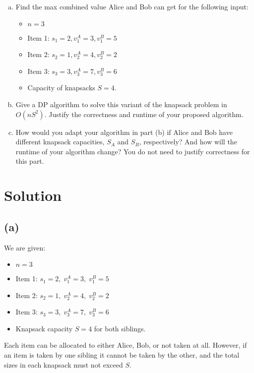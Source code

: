 \documentclass[11pt]{article}
\begin{document}
\begin{tcolorbox}[title={Problem 1 (Knapsack, Take II, 50 pts)}]
        \begin{enumerate}[(a)]
            \item Find the max combined value Alice and Bob can get for the following input:
            \begin{itemize}
                \item \( n = 3 \)
                \item Item 1: \( s_1 = 2, v_1^A = 3, v_1^B = 5 \)
                \item Item 2: \( s_2 = 1, v_2^A = 4, v_2^B = 2 \)
                \item Item 3: \( s_3 = 3, v_3^A = 7, v_3^B = 6 \)
                \item Capacity of knapsacks \(S = 4\).
            \end{itemize} 
            \item Give a DP algorithm to solve this variant of the knapsack problem in $O(nS^2)$. Justify the correctness and runtime of your proposed algorithm. 
            \item How would you adapt your algorithm in part (b) if Alice and Bob have different knapsack capacities, \(S_A\) and \(S_B\), respectively? And how will the runtime of your algorithm change? You do not need to justify correctness for this part.
        \end{enumerate}
    \end{tcolorbox}

    \section*{Solution}

    \subsection*{(a)}
    We are given:
    \begin{itemize}
        \item \( n = 3 \)
        \item Item 1: \( s_1 = 2,\; v_1^A = 3,\; v_1^B = 5 \)
        \item Item 2: \( s_2 = 1,\; v_2^A = 4,\; v_2^B = 2 \)
        \item Item 3: \( s_3 = 3,\; v_3^A = 7,\; v_3^B = 6 \)
        \item Knapsack capacity \( S = 4 \) for both siblings.
    \end{itemize}
    
    Each item can be allocated to either Alice, Bob, or not taken at all. However, if an item is taken by one sibling it cannot be taken by the other, and the total sizes in each knapsack must not exceed \(S\).
    
\end{document}
